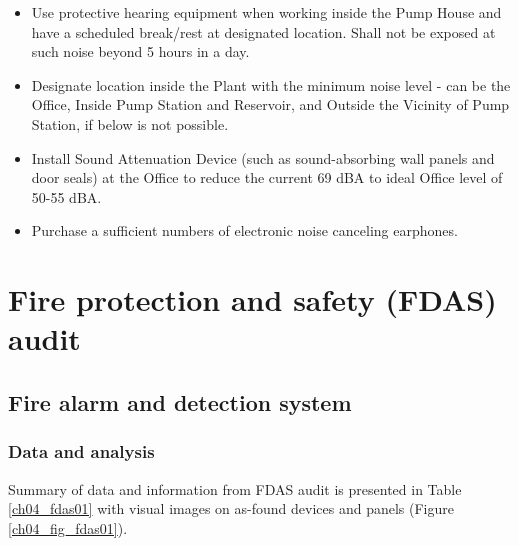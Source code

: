 \begin{itemize}
	\item	Use protective hearing equipment when working inside the Pump House and have a scheduled break/rest at designated location. Shall not be exposed at such noise beyond 5 hours in a day.
	\item	Designate location inside the Plant with the minimum noise level - can be the Office, Inside Pump Station and Reservoir, and Outside the Vicinity of Pump Station, if below is not possible.
	\item	 Install Sound Attenuation Device (such as sound-absorbing wall panels and door seals) at the Office to reduce the current 69 dBA to ideal Office level of 50-55 dBA.
	
	\item Purchase a sufficient numbers of electronic noise canceling earphones.
\end{itemize}

\section{Fire protection and safety (FDAS) audit} \label{ch04fdas}
\subsection{Fire alarm and detection system} \label{ch04fdas01}
\subsubsection{Data and analysis}
Summary of data and information from FDAS audit is presented in Table \ref{ch04_fdas01} with visual images on as-found devices and panels (Figure \ref{ch04_fig_fdas01}).

